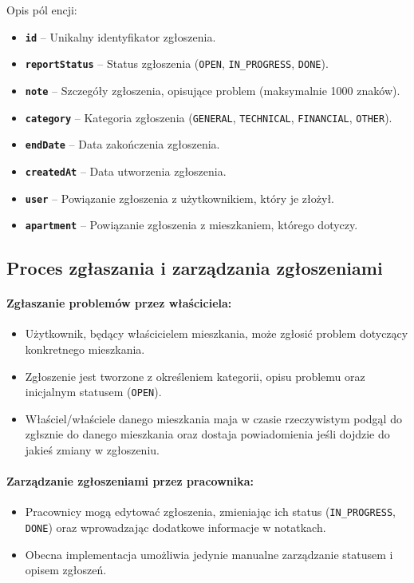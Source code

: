 Opis pól encji:
\begin{itemize}
    \item \textbf{\texttt{id}} -- Unikalny identyfikator zgłoszenia.
    \item \textbf{\texttt{reportStatus}} -- Status zgłoszenia (\texttt{OPEN}, \texttt{IN\_PROGRESS}, \texttt{DONE}).
    \item \textbf{\texttt{note}} -- Szczegóły zgłoszenia, opisujące problem (maksymalnie 1000 znaków).
    \item \textbf{\texttt{category}} -- Kategoria zgłoszenia (\texttt{GENERAL}, \texttt{TECHNICAL}, \texttt{FINANCIAL}, \texttt{OTHER}).
    \item \textbf{\texttt{endDate}} -- Data zakończenia zgłoszenia.
    \item \textbf{\texttt{createdAt}} -- Data utworzenia zgłoszenia.
    \item \textbf{\texttt{user}} -- Powiązanie zgłoszenia z użytkownikiem, który je złożył.
    \item \textbf{\texttt{apartment}} -- Powiązanie zgłoszenia z mieszkaniem, którego dotyczy.
\end{itemize}

\subsection{Proces zgłaszania i zarządzania zgłoszeniami}

\paragraph{Zgłaszanie problemów przez właściciela:}
\begin{itemize}
    \item Użytkownik, będący właścicielem mieszkania, może zgłosić problem dotyczący konkretnego mieszkania. 
    \item Zgłoszenie jest tworzone z określeniem kategorii, opisu problemu oraz inicjalnym statusem (\texttt{OPEN}).
		\item Właściel/właściele danego mieszkania maja w czasie rzeczywistym podgąl do zgłsznie do danego mieszkania oraz dostaja powiadomienia jeśli dojdzie  do jakieś zmiany w zgłoszeniu.
\end{itemize}

\paragraph{Zarządzanie zgłoszeniami przez pracownika:}
\begin{itemize}
    \item Pracownicy mogą edytować zgłoszenia, zmieniając ich status (\texttt{IN\_PROGRESS}, \texttt{DONE}) oraz wprowadzając dodatkowe informacje w notatkach.
    \item Obecna implementacja umożliwia jedynie manualne zarządzanie statusem i opisem zgłoszeń.
\end{itemize}

